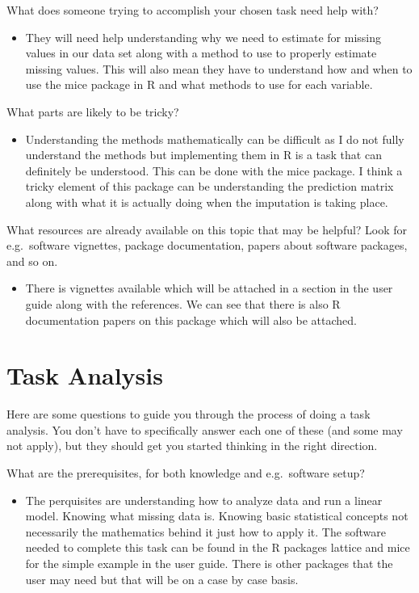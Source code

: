 \documentclass[
  letterpaper,
  DIV=11,
  numbers=noendperiod]{scrreprt}
\providecommand{\tightlist}{%
  \setlength{\itemsep}{0pt}\setlength{\parskip}{0pt}}\usepackage{longtable,booktabs,array}
\begin{document}
What does someone trying to accomplish your chosen task need help with?

\begin{itemize}
\tightlist
\item
  They will need help understanding why we need to estimate for missing
  values in our data set along with a method to use to properly estimate
  missing values. This will also mean they have to understand how and
  when to use the mice package in R and what methods to use for each
  variable.
\end{itemize}

What parts are likely to be tricky?

\begin{itemize}
\tightlist
\item
  Understanding the methods mathematically can be difficult as I do not
  fully understand the methods but implementing them in R is a task that
  can definitely be understood. This can be done with the mice package.
  I think a tricky element of this package can be understanding the
  prediction matrix along with what it is actually doing when the
  imputation is taking place.
\end{itemize}

What resources are already available on this topic that may be helpful?
Look for e.g.~software vignettes, package documentation, papers about
software packages, and so on.

\begin{itemize}
\tightlist
\item
  There is vignettes available which will be attached in a section in
  the user guide along with the references. We can see that there is
  also R documentation papers on this package which will also be
  attached.
\end{itemize}

\chapter{Task Analysis}\label{task-analysis}

Here are some questions to guide you through the process of doing a task
analysis. You don't have to specifically answer each one of these (and
some may not apply), but they should get you started thinking in the
right direction.

What are the prerequisites, for both knowledge and e.g.~software setup?

\begin{itemize}
\tightlist
\item
  The perquisites are understanding how to analyze data and run a linear
  model. Knowing what missing data is. Knowing basic statistical
  concepts not necessarily the mathematics behind it just how to apply
  it. The software needed to complete this task can be found in the R
  packages lattice and mice for the simple example in the user guide.
  There is other packages that the user may need but that will be on a
  case by case basis.
\end{itemize}
\end{document}
